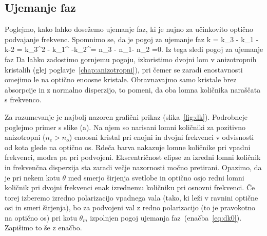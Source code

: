 \documentclass[11pt,fleqn]{book} %
\begin{document}
\subsection*{Ujemanje faz}
Poglejmo, kako lahko dosežemo ujemanje faz, ki je nujno za učinkovito optično
podvajanje frekvenc. Spomnimo se, da je pogoj za ujemanje faz 
\beq
\Delta k = k_3 - k_1 -k-2 = k_3^{2\omega} - k_1^{\omega} -k_2^\omega = 
 n_3 -  n_1-  n_2 =0.
\eeq
Iz tega sledi pogoj za ujemanje faz
Da lahko zadostimo gornjemu pogoju, izkoristimo dvojni lom v anizotropnih kristalih
(glej poglavje~\ref{chap:anizotropni}), pri čemer se zaradi enostavnosti omejimo le na optično 
enoosne kristale. Obravnavajmo samo kristale brez absorpcije in z normalno disperzijo, 
to pomeni, da oba lomna količnika naraščata s frekvenco.  


Za razumevanje je najbolj nazoren grafični prikaz (slika~\ref{fig:dk}). 
Podrobneje poglejmo primer s slike (a). Na njem so narisani lomni količniki za pozitivno
anizotropni ($n_e>n_o$) enoosni kristal pri enojni in dvojni
frekvenci v odvisnosti od kota glede na optično os. Rdeča barva nakazuje lomne količnike
pri vpadni frekvenci, modra pa pri podvojeni. Ekscentričnost elipse za 
izredni lomni količnik in frekvenčna disperzija sta zaradi večje nazornosti močno 
pretirani. Opazimo, da je pri nekem kotu $\theta$ med smerjo širjenja svetlobe in optično 
osjo redni lomni količnik pri dvojni frekvenci enak izrednemu količniku pri osnovni
frekvenci. Če torej izberemo izredno polarizacijo vpadnega vala (tako, ki leži
v ravnini optične osi in smeri širjenja), bo za podvojeni val z redno
polarizacijo (to je pravokotno na optično os) pri kotu
$\theta_m$ izpolnjen pogoj ujemanja faz~(enačba~\ref{eq:dk0}). Zapišimo to še z enačbo.\\
\end{document}
